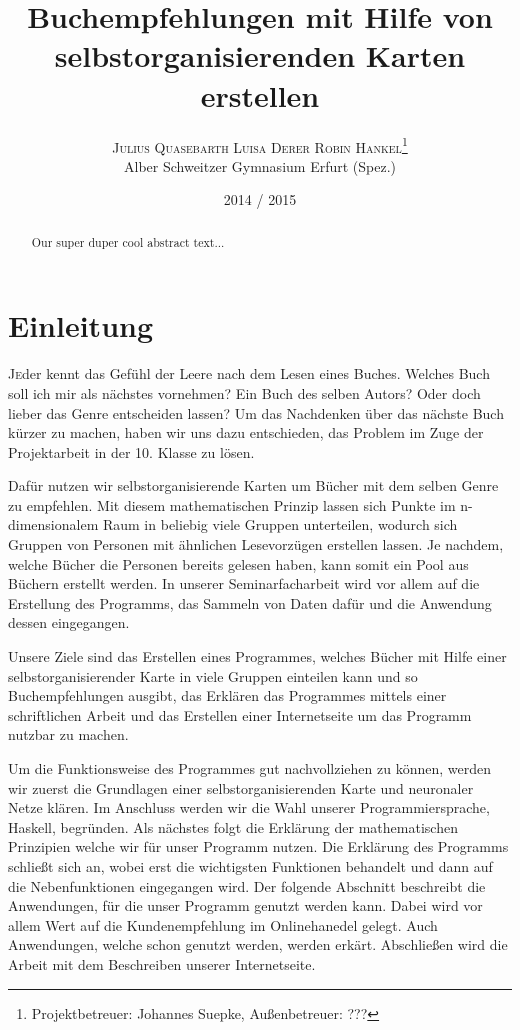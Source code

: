 \documentclass[twoside,a4paper,draft]{article}
\title{\vspace{-15mm}\fontsize{24pt}{10pt}\selectfont\bfseries{}Buchempfehlungen mit Hilfe von selbstorganisierenden Karten erstellen}
\author{\large\textsc{Julius Quasebarth \quad Luisa Derer \quad Robin Hankel}\thanks{Projektbetreuer: Johannes Suepke, Außenbetreuer: ???}\\[2mm]\normalsize Alber Schweitzer Gymnasium Erfurt (Spez.)\\\vspace{-5mm}}
\date{2014 / 2015}
\newcommand{\commonlettrine}[1]{\lettrine[nindent=0em,lines=2]{#1}}
\begin{document}
\maketitle

\thispagestyle{fancy}


\begin{otherlanguage}{english}
\begin{abstract}
\noindent
Our super duper cool abstract text...
\end{abstract}
\end{otherlanguage}

\tableofcontents

\section{Einleitung}

\commonlettrine{J}eder kennt das Gefühl der Leere nach dem Lesen eines Buches. Welches Buch soll ich mir als nächstes vornehmen? Ein Buch des selben Autors? Oder doch lieber das Genre entscheiden lassen?
Um das Nachdenken über das nächste Buch kürzer zu machen, haben wir uns dazu entschieden, das Problem im Zuge der Projektarbeit in der 10. Klasse zu lösen.

Dafür nutzen wir selbstorganisierende Karten um Bücher mit dem selben Genre zu empfehlen. Mit diesem mathematischen Prinzip lassen sich Punkte im n-dimensionalem Raum in beliebig viele Gruppen unterteilen, wodurch sich Gruppen von Personen mit ähnlichen Lesevorzügen erstellen lassen. Je nachdem, welche Bücher die Personen bereits gelesen haben, kann somit ein \glqq{}Pool\grqq{} aus Büchern erstellt werden. In unserer Seminarfacharbeit wird vor allem auf die Erstellung des Programms, das Sammeln von Daten dafür und die Anwendung dessen eingegangen.
 
Unsere Ziele sind das Erstellen eines Programmes, welches Bücher mit Hilfe einer selbstorganisierender Karte in viele Gruppen einteilen kann und so Buchempfehlungen ausgibt, das Erklären das Programmes mittels einer schriftlichen Arbeit und das Erstellen einer Internetseite um das Programm nutzbar zu machen.

Um die Funktionsweise des Programmes gut nachvollziehen zu können, werden wir zuerst die Grundlagen einer selbstorganisierenden Karte und neuronaler Netze klären. Im Anschluss werden wir die Wahl unserer Programmiersprache, Haskell, begründen. Als nächstes folgt die Erklärung der mathematischen Prinzipien welche wir für unser Programm nutzen. Die Erklärung des Programms schließt sich an, wobei erst die wichtigsten Funktionen behandelt und dann auf die Nebenfunktionen eingegangen wird. Der folgende Abschnitt beschreibt die Anwendungen, für die unser Programm genutzt werden kann. Dabei wird vor allem Wert auf die Kundenempfehlung im Onlinehanedel gelegt. Auch Anwendungen, welche schon genutzt werden, werden erkärt. Abschließen wird die Arbeit mit dem Beschreiben unserer Internetseite.
\end{document}
